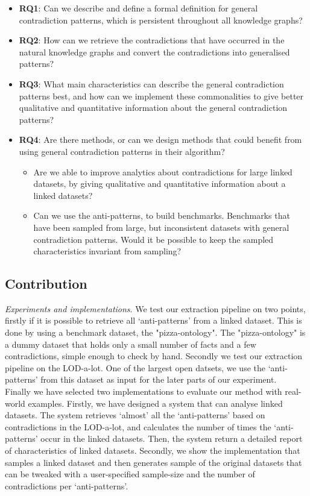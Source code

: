 \documentclass{article}
\begin{document}
\begin{itemize}
	\item \textbf{RQ1}: Can we describe and define a formal definition for general contradiction patterns, which is persistent throughout all knowledge graphs?
	\item \textbf{RQ2}: How can we retrieve the contradictions that have occurred in the natural knowledge graphs and convert the contradictions into generalised patterns?
	\item \textbf{RQ3}: What main characteristics can describe the general contradiction patterns best, and how can we implement these commonalities to give better qualitative and quantitative information about the general contradiction patterns?
	\item \textbf{RQ4}: Are there methods, or can we design methods that could benefit from using general contradiction patterns in their algorithm? 
	\begin{itemize}
		\item Are we able to improve analytics about contradictions for large linked datasets, by giving qualitative and quantitative information about a linked datasets?
		\item Can we use the anti-patterns, to build benchmarks. Benchmarks that have been sampled from large, but inconsistent datasets with general contradiction patterns. Would it be possible to keep the sampled characteristics invariant from sampling?
	\end{itemize}
\end{itemize}

\subsection{Contribution}
\textit{Experiments and implementations}. We test our extraction pipeline on two points, firstly if it is possible to retrieve all `anti-patterns' from a linked dataset. This is done by using a benchmark dataset, the "pizza-ontology". The "pizza-ontology" is a dummy dataset that holds only a small number of facts and a few contradictions, simple enough to check by hand. Secondly we test our extraction pipeline on the LOD-a-lot. One of the largest open datsets, we use the `anti-patterns' from this dataset as input for the later parts of our experiment.\\

Finally we have selected two implementations to evaluate our method with real-world examples. Firstly, we have designed a system that can analyse linked datasets. The system retrieves `almost' all the  `anti-patterns' based on contradictions in the LOD-a-lot, and calculates the number of times the `anti-patterns' occur in the linked datasets. Then, the system return a detailed report of characteristics of linked datasets.
Secondly, we show the implementation that samples a linked dataset and then generates sample of the original datasets that can be tweaked with a user-specified sample-size and the number of contradictions per `anti-patterns'. \\
\end{document}
